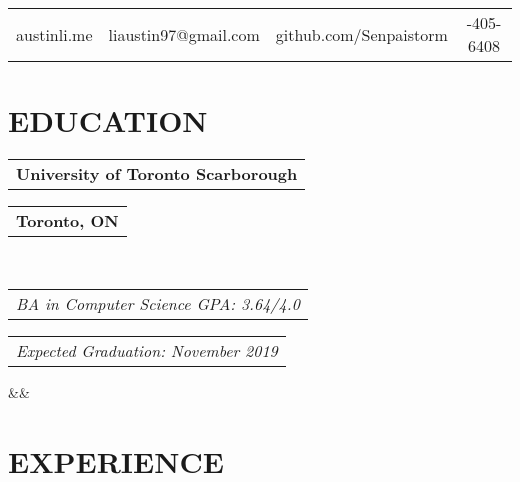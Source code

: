 \documentclass[12pt,a4paper,sans]{moderncv}        %
\makeatletter
\newcommand*{\customcventry}[7][.25em]{
	\begin{tabular}{@{}l} 
		{\bfseries #4}
	\end{tabular}
	\hfill%
	\begin{tabular}{l@{}}
		{\bfseries #5}
	\end{tabular} \\
	\begin{tabular}{@{}l} 
		{\itshape #3}
	\end{tabular}
	\hfill%
	\begin{tabular}{l@{}}
		{\itshape #2}
	\end{tabular}
	\ifx&#7&%
	\else{\\%
		\begin{minipage}{\maincolumnwidth}%
			\small#7%
	\end{minipage}}\fi%
	\par\addvspace{#1}}
\makeatother
\begin{document}
	\makecvtitle
	\vspace*{-23mm}
	
	\begin{center}
		\begin{tabular}{ c c c c }
			\faGlobe\enspace austinli.me & \faEnvelopeO\enspace liaustin97@gmail.com & \faGithub\enspace github.com/Senpaistorm & \faMobile\enspace 647-405-6408\\  
		\end{tabular}
	\end{center}
	
	\section{EDUCATION}
	{\customcventry{Expected Graduation: November 2019}{BA in Computer Science GPA: 3.64/4.0}{University of Toronto Scarborough}{Toronto, ON}{}{}}
	
	\section{EXPERIENCE}
	
\end{document}
